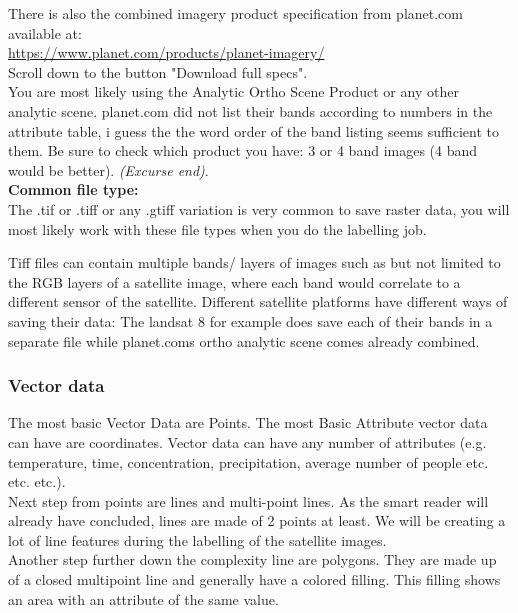 \documentclass[12pt,a4paper]{scrartcl}
\begin{document}
There is also the combined imagery product specification from planet.com available at: \\
\url{https://www.planet.com/products/planet-imagery/} \\
Scroll down to the button "Download full specs". \\
You are most likely using the Analytic Ortho Scene Product or any other analytic scene.
planet.com did not list their bands according to numbers in the attribute table, i guess the the word order of the band listing seems sufficient to them.
Be sure to check which product you have: 3 or 4 band images (4 band would be better).  
\textit{(Excurse end)}. \\

\textbf{Common file type:} \\

The .tif or .tiff or any .gtiff variation is very common to save raster data, you will most likely work with these file types when you do the labelling job.  

Tiff files can contain multiple bands/ layers of images such as but not limited to the RGB layers of a satellite image,
where each band would correlate to a different sensor of the satellite.
Different satellite platforms have different ways of saving their data: 
The landsat 8 for example does save each of their bands in a separate file while planet.coms ortho analytic scene comes already combined. 

\subsubsection{Vector data}

The most basic Vector Data are Points. The most Basic Attribute vector data can have are coordinates. 
Vector data can have any number of attributes (e.g. temperature, time, concentration, precipitation, average number of people etc. etc. etc.). \\

Next step from points are lines and multi-point lines.
As the smart reader will already have concluded, lines are made of 2 points at least.
We will be creating a lot of line features during the labelling of the satellite images.\\

Another step further down the complexity line are polygons. 
They are made up of a closed multipoint line and generally have a colored filling.
This filling shows an area with an attribute of the same value. \\
\end{document}
